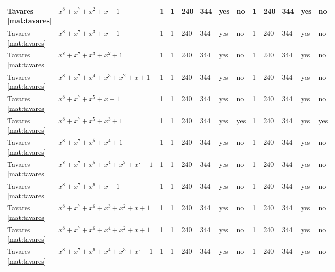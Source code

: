 \begin{tiny}
\begin{longtable}{|l|l|l|l|l|l|l|l|l|l|l|l|l|}
\shortstack{Tavares \\ \eqref{mat:tavares}} & $x^8 + x^7 + x^2 + x + 1$ & 1 & 1 & 240 & 344 & yes & no & 1 & 240 & 344 & yes & no \\ \hline
\shortstack{Tavares \\ \eqref{mat:tavares}} & $x^8 + x^7 + x^3 + x + 1$ & 1 & 1 & 240 & 344 & yes & no & 1 & 240 & 344 & yes & no \\ \hline
\shortstack{Tavares \\ \eqref{mat:tavares}} & $x^8 + x^7 + x^3 + x^2 + 1$ & 1 & 1 & 240 & 344 & yes & no & 1 & 240 & 344 & yes & no \\ \hline
\shortstack{Tavares \\ \eqref{mat:tavares}} & $x^8 + x^7 + x^4 + x^3 + x^2 + x + 1$ & 1 & 1 & 240 & 344 & yes & no & 1 & 240 & 344 & yes & no \\ \hline
\shortstack{Tavares \\ \eqref{mat:tavares}} & $x^8 + x^7 + x^5 + x + 1$ & 1 & 1 & 240 & 344 & yes & no & 1 & 240 & 344 & yes & no \\ \hline
\shortstack{Tavares \\ \eqref{mat:tavares}} & $x^8 + x^7 + x^5 + x^3 + 1$ & 1 & 1 & 240 & 344 & yes & yes & 1 & 240 & 344 & yes & yes \\ \hline
\shortstack{Tavares \\ \eqref{mat:tavares}} & $x^8 + x^7 + x^5 + x^4 + 1$ & 1 & 1 & 240 & 344 & yes & no & 1 & 240 & 344 & yes & no \\ \hline
\shortstack{Tavares \\ \eqref{mat:tavares}} & $x^8 + x^7 + x^5 + x^4 + x^3 + x^2 + 1$ & 1 & 1 & 240 & 344 & yes & no & 1 & 240 & 344 & yes & no \\ \hline
\shortstack{Tavares \\ \eqref{mat:tavares}} & $x^8 + x^7 + x^6 + x + 1$ & 1 & 1 & 240 & 344 & yes & no & 1 & 240 & 344 & yes & no \\ \hline
\shortstack{Tavares \\ \eqref{mat:tavares}} & $x^8 + x^7 + x^6 + x^3 + x^2 + x + 1$ & 1 & 1 & 240 & 344 & yes & no & 1 & 240 & 344 & yes & no \\ \hline
\shortstack{Tavares \\ \eqref{mat:tavares}} & $x^8 + x^7 + x^6 + x^4 + x^2 + x + 1$ & 1 & 1 & 240 & 344 & yes & no & 1 & 240 & 344 & yes & no \\ \hline
\shortstack{Tavares \\ \eqref{mat:tavares}} & $x^8 + x^7 + x^6 + x^4 + x^3 + x^2 + 1$ & 1 & 1 & 240 & 344 & yes & no & 1 & 240 & 344 & yes & no \\ \hline

\end{longtable}
\end{tiny}
